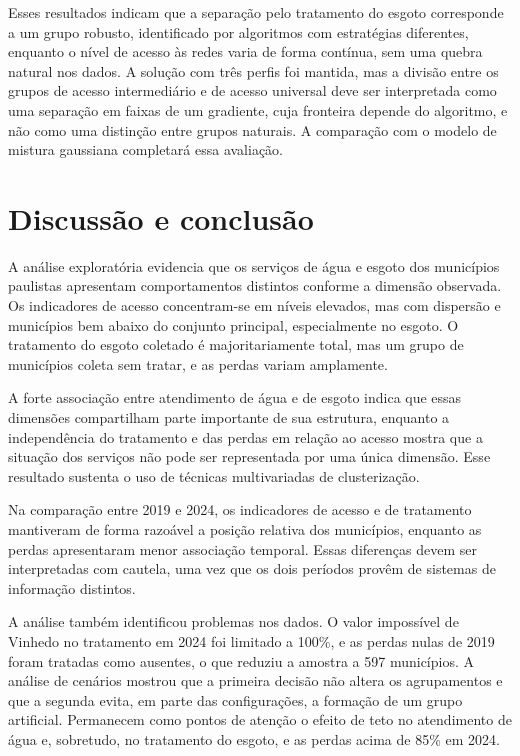 \documentclass[12pt]{article}
\begin{document}
Esses resultados indicam que a separação pelo tratamento do esgoto corresponde a um grupo robusto,
identificado por algoritmos com estratégias diferentes, enquanto o nível de acesso às redes varia de
forma contínua, sem uma quebra natural nos dados. A solução com três perfis foi mantida, mas a divisão
entre os grupos de acesso intermediário e de acesso universal deve ser interpretada como uma
separação em faixas de um gradiente, cuja fronteira depende do algoritmo, e não como uma distinção
entre grupos naturais. A comparação com o modelo de mistura gaussiana completará essa avaliação.

\section{Discussão e conclusão}

A análise exploratória evidencia que os serviços de água e esgoto dos municípios paulistas
apresentam comportamentos distintos conforme a dimensão observada. Os indicadores de acesso
concentram-se em níveis elevados, mas com dispersão e municípios bem abaixo do conjunto principal,
especialmente no esgoto. O tratamento do esgoto coletado é majoritariamente total, mas um grupo de
municípios coleta sem tratar, e as perdas variam amplamente.

A forte associação entre atendimento de água e de esgoto indica que essas dimensões compartilham
parte importante de sua estrutura, enquanto a independência do tratamento e das perdas em relação ao
acesso mostra que a situação dos serviços não pode ser representada por uma única dimensão. Esse
resultado sustenta o uso de técnicas multivariadas de clusterização.

Na comparação entre 2019 e 2024, os indicadores de acesso e de tratamento mantiveram de forma
razoável a posição relativa dos municípios, enquanto as perdas apresentaram menor associação
temporal. Essas diferenças devem ser interpretadas com cautela, uma vez que os dois períodos provêm
de sistemas de informação distintos.

A análise também identificou problemas nos dados. O valor impossível de Vinhedo no tratamento em
2024 foi limitado a 100\%, e as perdas nulas de 2019 foram tratadas como ausentes, o que reduziu a
amostra a 597 municípios. A análise de cenários mostrou que a primeira decisão não altera os
agrupamentos e que a segunda evita, em parte das configurações, a formação de um grupo artificial.
Permanecem como pontos de atenção o efeito de teto no atendimento de água e, sobretudo, no tratamento
do esgoto, e as perdas acima de 85\% em 2024.
\end{document}
